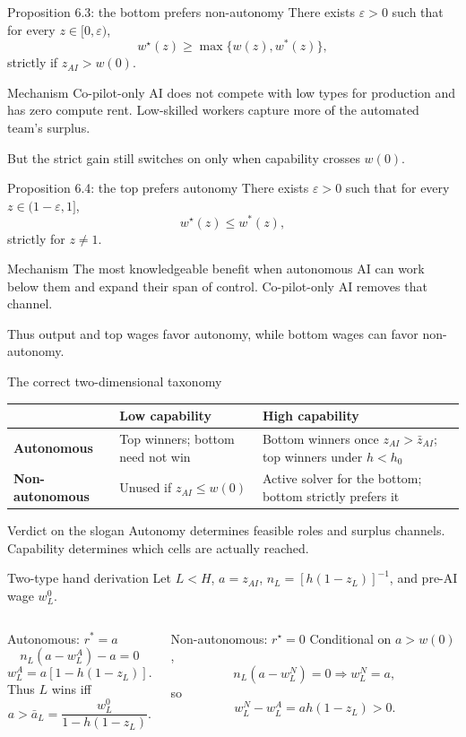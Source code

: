 \documentclass[aspectratio=169,10pt]{beamer}
\newcommand{\wpre}{w}
\newcommand{\waut}{w^*}
\newcommand{\wnon}{w^\star}
\begin{document}
\begin{frame}{Proposition 6.3: the bottom prefers non-autonomy}
\small
There exists $\varepsilon>0$ such that for every $z\in[0,\varepsilon)$,
\[
\boxed{\wnon(z)\ge\max\{\wpre(z),\waut(z)\}},
\]
strictly if $z_{AI}>w(0)$.
\begin{block}{Mechanism}
Co-pilot-only AI does not compete with low types for production and has zero compute rent. Low-skilled workers capture more of the automated team's surplus.
\end{block}
But the strict gain still switches on only when capability crosses $w(0)$.
\end{frame}

\begin{frame}{Proposition 6.4: the top prefers autonomy}
\small
There exists $\varepsilon>0$ such that for every $z\in(1-\varepsilon,1]$,
\[
\boxed{\wnon(z)\le\waut(z)},
\]
strictly for $z\ne1$.
\begin{block}{Mechanism}
The most knowledgeable benefit when autonomous AI can work below them and expand their span of control. Co-pilot-only AI removes that channel.
\end{block}
Thus output and top wages favor autonomy, while bottom wages can favor non-autonomy.
\end{frame}

\begin{frame}{The correct two-dimensional taxonomy}
\small
\centering
\begin{tabularx}{.96\textwidth}{>{\bfseries}lXX}
\toprule
& Low capability & High capability \\
\midrule
Autonomous & Top winners; bottom need not win & Bottom winners once $z_{AI}>\bar z_{AI}$; top winners under $h<h_0$ \\
\addlinespace
Non-autonomous & Unused if $z_{AI}\le w(0)$ & Active solver for the bottom; bottom strictly prefers it \\
\bottomrule
\end{tabularx}
\vspace{.4cm}
\begin{alertblock}{Verdict on the slogan}
Autonomy determines feasible roles and surplus channels. Capability determines which cells are actually reached.
\end{alertblock}
\end{frame}

\begin{frame}{Two-type hand derivation}
\small
Let $L<H$, $a=z_{AI}$, $n_L=[h(1-z_L)]^{-1}$, and pre-AI wage $w_L^0$.
\begin{columns}[T,onlytextwidth]
\begin{block}{Autonomous: $r^*=a$}
\[
n_L(a-w_L^A)-a=0
\]
\[
w_L^A=a[1-h(1-z_L)].
\]
Thus $L$ wins iff
\[
a>\bar a_L=\frac{w_L^0}{1-h(1-z_L)}.
\]
\end{block}
\begin{alertblock}{Non-autonomous: $r^\star=0$}
Conditional on $a>w(0)$,
\[
n_L(a-w_L^N)=0\Rightarrow w_L^N=a,
\]
so
\[
w_L^N-w_L^A=ah(1-z_L)>0.
\]
\end{alertblock}
\end{columns}
\end{frame}
\end{document}
